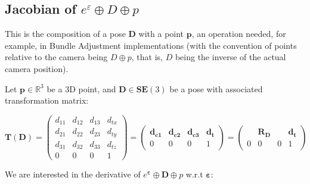 \documentclass[a4paper,11pt]{report}
\newcommand{\E}{{\bm{\varepsilon}}}
\begin{document}
\subsection{Jacobian of $e^\varepsilon \oplus D \oplus p$}
\label{sect:jacob_eDp}

This is the composition of a pose $\mathbf{D}$ with a point $\mathbf{p}$, 
an operation needed, for example, in Bundle Adjustment implementations \cite{triggs2000bundle}
(with the convention of points relative to the camera being $D \oplus p$, that is, 
$D$ being the inverse of the actual camera position).

Let $\mathbf{p} \in \mathbb{R}^3$ be a 3D point, and 
$\mathbf{D} \in \mathbf{SE}(3)$ be a pose with associated transformation matrix:

\begin{equation}
\mathbf{T}(\mathbf{D}) = 
\left(
\begin{array}{ccc|c}
 d_{11} & d_{12} & d_{13} & d_{tx}   \\
 d_{21} & d_{22} & d_{23} & d_{ty}   \\
 d_{31} & d_{32} & d_{33} & d_{tz}   \\
\hline
  0 & 0 & 0 & 1
\end{array}
\right) 
=
\left(
\begin{array}{ccc|c}
 \mathbf{d_{c1}}  & \mathbf{d_{c2}}  & \mathbf{d_{c3}}  & \mathbf{d_{t}}  \\
\hline
  0 & 0 & 0 & 1
\end{array}
\right)
= 
\left(
\begin{array}{ccc|c}
   & \mathbf{R_D}  &  & \mathbf{d_{t}}  \\
\hline
  0 & 0 & 0 & 1
\end{array}
\right)
\end{equation}

We are interested in the derivative of $e^\E \oplus \mathbf{D} \oplus p$ w.r.t $\E$:
\end{document}
